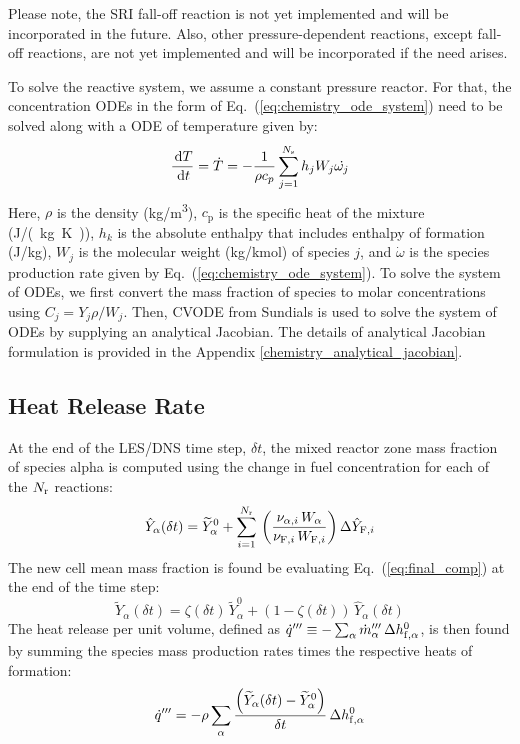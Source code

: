 Please note, the SRI fall-off reaction is not yet implemented and will be incorporated in the future. Also, other pressure-dependent reactions, except fall-off reactions, are not yet implemented and will be incorporated if the need arises.

To solve the reactive system, we assume a constant pressure reactor. For that, the concentration ODEs in the form of Eq.~(\ref{eq:chemistry_ode_system}) need to be solved along with a ODE of temperature given by:
\begin{equation}\label{eq:TemperatureDerivative}
\frac{\,\mathrm{d} T}{\,\mathrm{d} t} = \dot{T} = -\frac{1}{\rho c_p} \sum_{j=1}^{N_{\mathrm{s}}}h_j W_j \dot{\omega_j}
\end{equation} 
Here,  $\rho$  is the density (\si{kg/m^3}), $c_{\mathrm{p}}$ is the specific heat of the mixture (\si{J/(kg.K)}), $h_k$ is the absolute enthalpy that includes enthalpy of formation (J/kg), $W_j$ is the molecular weight (kg/kmol) of species $j$, and $\dot{\omega}$ is the species production rate given by Eq.~(\ref{eq:chemistry_ode_system}).
To solve the system of ODEs, we first convert the mass fraction of species to molar concentrations using $C_j=Y_j\rho/W_j$. Then, CVODE from Sundials \cite{cvodeDoc:2024} is used to solve the system of ODEs by supplying an analytical Jacobian. The details of analytical Jacobian formulation is provided in the Appendix \ref{chemistry_analytical_jacobian}.


\subsection{Heat Release Rate}
\label{sec:hrr}

At the end of the LES/DNS time step, $\delta t$, the mixed reactor zone mass fraction of species alpha is computed using the change in fuel concentration for each of the $N_{\rm r}$ reactions:
\begin{equation}\label{eq:change_alpha}
\hat{Y}_\alpha(\delta t) = \widetilde{Y}_\alpha^0 + \sum_{i=1}^{N_{\rm r}} \,\left(\frac{\nu_{\alpha,i} \,W_{\alpha}}{\nu_{{\rm F},i} \,W_{{\rm F},i}}\right)\Delta \hat{Y}_{{\rm F},i}
\end{equation}
The new cell mean mass fraction is found be evaluating Eq.~(\ref{eq:final_comp}) at the end of the time step:
\begin{equation}
\label{eq:final_comp2}
\widetilde{Y}_{\alpha}(\delta t)= \zeta(\delta t) \, \widetilde{Y}_{\alpha}^0 + (1-\zeta(\delta t)) \, \hat{Y}_{\alpha}(\delta t)
\end{equation}
The heat release per unit volume, defined as $\dot{q}''' \equiv - \sum_\alpha \dot{m}_\alpha''' \, \Delta h_{{\rm f},\alpha}^0$, is then found by summing the species mass production rates times the respective heats of formation:
\begin{equation}\label{eq:vol_heat_gen}
\dot{q}''' = - \rho  \sum_{\alpha} \frac{ \left( \widetilde{Y}_{\alpha}(\delta t)-\widetilde{Y}_{\alpha}^0 \right) }{\delta t} \, \Delta h_{{\rm f},\alpha}^0
\end{equation}





